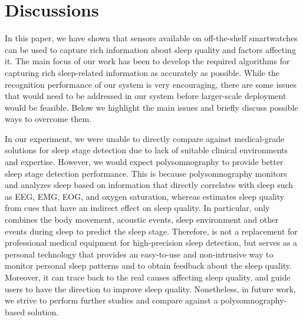 \section{Discussions}\label{sec:discussion}

In this paper, we have shown that sensors available on off-the-shelf smartwatches can be used to capture rich information about sleep quality and factors affecting it. The main focus of our work has been to develop the required algorithms for capturing rich sleep-related information as accurately as possible. While the recognition performance of our system is very encouraging, there are some issues that would need to be addressed in our system before larger-scale deployment would be feasible. Below we highlight the main issues and briefly discuss possible ways to overcome them.


 {In our experiment, we were unable to directly compare {\systemname} against
medical-grade solutions for sleep stage detection due to lack of suitable clinical environments and expertise.} However, we would expect
polysomnography to provide better sleep stage detection performance. This is because polysomnography monitors and analyzes sleep based on
information that directly correlates with sleep such as EEG, EMG, EOG, and oxygen saturation, whereas {\systemname} estimates sleep quality
from cues that have an indirect effect on sleep quality. In particular, {\systemname} only combines the body movement, acoustic events,
sleep environment and other events during sleep to predict the sleep stage. Therefore, {\systemname} is not a replacement for professional
medical equipment for high-precision sleep detection, but serves as a personal technology that provides an easy-to-use and non-intrusive
way to monitor personal sleep patterns and to obtain feedback about the sleep quality. Moreover, it can trace back to the real causes
affecting sleep quality, and guide users to have the direction to improve sleep quality. Nonetheless, in future work, we strive to perform
further studies and compare {\systemname} against a polysomnography-based solution.

